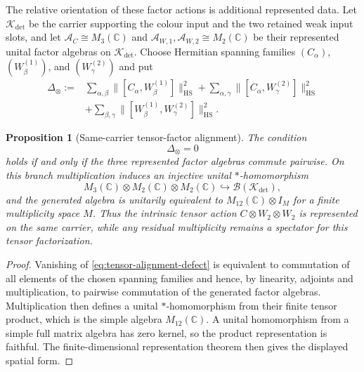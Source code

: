 \documentclass[11pt]{article}
\numberwithin{equation}{section}
\newtheorem{proposition}[theorem]{Proposition}
\theoremstyle{definition}
\theoremstyle{remark}
\newcommand{\C}{\mathbb C}
\newcommand{\HS}{\mathrm{HS}}
\newcommand{\norm}[1]{\lVert#1\rVert}
\begin{document}
The relative orientation of these factor actions is additional represented
data.  Let $\mathcal K_{\det}$ be the carrier supporting the colour input and
the two retained weak input slots, and let
$\mathcal A_C\cong M_3(\C)$ and
$\mathcal A_{W,1},\mathcal A_{W,2}\cong M_2(\C)$ be their represented unital
factor algebras on $\mathcal K_{\det}$.  Choose Hermitian spanning families
$(C_\alpha)$, $(W_\beta^{(1)})$, and $(W_\gamma^{(2)})$ and put
\begin{equation}
\begin{aligned}
\Delta_{\otimes}:={}&
\sum_{\alpha,\beta}\norm{[C_\alpha,W_\beta^{(1)}]}_{\HS}^2
+\sum_{\alpha,\gamma}\norm{[C_\alpha,W_\gamma^{(2)}]}_{\HS}^2\\
&+\sum_{\beta,\gamma}\norm{[W_\beta^{(1)},W_\gamma^{(2)}]}_{\HS}^2.
\end{aligned}
\label{eq:tensor-alignment-defect}
\end{equation}

\begin{proposition}[Same-carrier tensor-factor alignment]
\label{thm:tensor-factor-alignment}
The condition
\begin{equation}
\Delta_{\otimes}=0
\label{eq:tensor-alignment-zero}
\end{equation}
holds if and only if the three represented factor algebras commute pairwise.
On this branch multiplication induces an injective unital $*$-homomorphism
\begin{equation}
M_3(\C)\otimes M_2(\C)\otimes M_2(\C)
\hookrightarrow\mathcal B(\mathcal K_{\det}),
\label{eq:tensor-factor-product}
\end{equation}
and the generated algebra is unitarily equivalent to
$M_{12}(\C)\otimes I_M$ for a finite multiplicity space $M$.  Thus the
intrinsic tensor action $C\otimes W_2\otimes W_2$ is represented on the same
carrier, while any residual multiplicity remains a spectator for this tensor
factorization.
\end{proposition}

\begin{proof}
Vanishing of \eqref{eq:tensor-alignment-defect} is equivalent to commutation of
all elements of the chosen spanning families and hence, by linearity,
adjoints and multiplication, to pairwise commutation of the generated factor
algebras.  Multiplication then defines a unital $*$-homomorphism from their
finite tensor product, which is the simple algebra $M_{12}(\C)$.  A unital
homomorphism from a simple full matrix algebra has zero kernel, so the product
representation is faithful.  The finite-dimensional representation theorem
then gives the displayed spatial form.
\end{proof}
\end{document}
